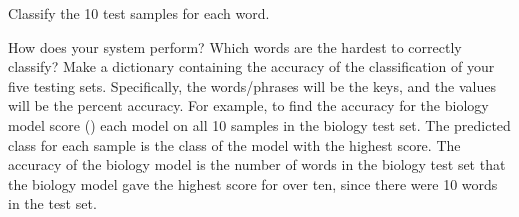 \begin{problem}
Classify the 10 test samples for each word. 

How does your system perform? Which words are the hardest to correctly classify?
Make a dictionary containing the accuracy of the classification of your five testing sets. 
Specifically, the words/phrases will be the keys, and the values will be the percent accuracy. 
For example, to find the accuracy for the biology model score () each model on all 10 samples in the biology test set. 
The predicted class for each sample is the class of the model with the highest score.
The accuracy of the biology model is the number of words in the biology test set that the biology model gave the highest score for over ten, since there were 10 words in the test set.
\end{problem}

























